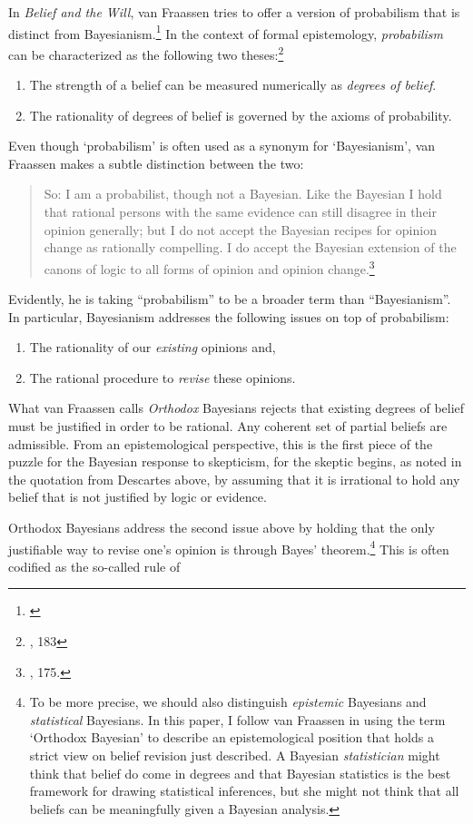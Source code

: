 In \emph{Belief and the Will}, van Fraassen tries to offer a version of
probabilism that is distinct from Bayesianism.\footnote{\cite{beliefwill}} In the context of formal
epistemology, \emph{probabilism} can be characterized as the following
two theses:\footnote{\cite{erikssonhajek}, 183}

\begin{enumerate}
\tightlist
\item
  The strength of a belief can be measured numerically as \emph{degrees
  of belief}.
\item
  The rationality of degrees of belief is governed by the axioms of
  probability.
\end{enumerate}

Even though `probabilism' is often used as a synonym for `Bayesianism',
van Fraassen makes a subtle distinction between the two:

\begin{quote}
So: I am a probabilist, though not a Bayesian. Like the Bayesian I hold
that rational persons with the same evidence can still disagree in their
opinion generally; but I do not accept the Bayesian recipes for opinion
change as rationally compelling. I do accept the Bayesian extension of
the canons of logic to all forms of opinion and opinion
change.\footnote{\cite{bvflaws}, 175.}
\end{quote}

Evidently, he is taking ``probabilism'' to be a broader term than
``Bayesianism''. In particular, Bayesianism addresses the following
issues on top of probabilism:

\begin{enumerate}
\tightlist
\item
  The rationality of our \emph{existing} opinions and,
\item
  The rational procedure to \emph{revise} these opinions.
\end{enumerate}

What van Fraassen calls \emph{Orthodox} Bayesians rejects that existing degrees of belief must be justified in order to be rational. Any coherent set of partial beliefs are admissible. From an epistemological perspective, this is the first piece of the puzzle for the Bayesian response to skepticism, for the skeptic begins, as noted in the quotation from Descartes above, by assuming that it is irrational to hold any belief that is not justified by logic or evidence. 

Orthodox Bayesians address the second issue above
by holding that the only justifiable way to revise one's opinion is
through Bayes' theorem.\footnote{To be more precise, we should also
  distinguish \emph{epistemic} Bayesians and \emph{statistical}
  Bayesians. In this paper, I follow van Fraassen in using the term
  `Orthodox Bayesian' to describe an epistemological position that holds
  a strict view on belief revision just described. A Bayesian
  \emph{statistician} might think that belief do come in degrees and
  that Bayesian statistics is the best framework for drawing statistical
  inferences, but she might not think that all beliefs can be
  meaningfully given a Bayesian analysis.} This is often codified as the
so-called rule of

